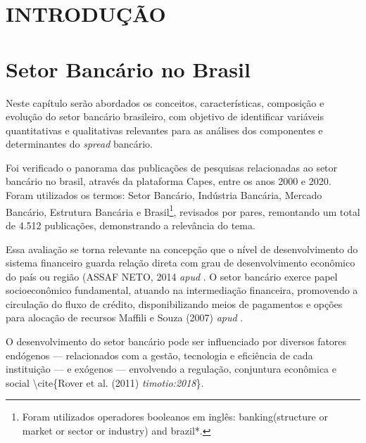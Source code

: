 \documentclass[12pt,openright,oneside,a4paper,chapter=TITLE,section=TITLE,subsection=Title,english,french,spanish,portugues,sumario=tradicional]{04-class-files/abntex2}
\begin{document}




\textual
\pagestyle{simple}

\chapter[INTRODUÇÃO]{INTRODUÇÃO}

\textual
\pagestyle{simple}

\chapter{Setor Bancário no Brasil}

Neste capítulo serão abordados os conceitos, características, composição e
evolução do setor bancário brasileiro, com objetivo de identificar variáveis
quantitativas e qualitativas relevantes para as análises dos componentes e
determinantes do \emph{spread} bancário.

Foi verificado o panorama das publicações de pesquisas relacionadas ao setor bancário no brasil, através da plataforma Capes, entre os anos 2000 e 2020. Foram utilizados os termos: Setor Bancário, Indústria Bancária, Mercado Bancário, Estrutura Bancária e Brasil\footnote{Foram utilizados operadores booleanos em inglês: banking(structure or market or sector or industry) and brazil*.}, revisados por pares, remontando um total de 4.512 publicações, demonstrando a relevância do tema.

Essa avaliação se torna relevante na concepção que o nível de desenvolvimento
do sistema financeiro guarda relação direta com grau de desenvolvimento
econômico do país ou região (ASSAF NETO, 2014 \emph{apud} \cite{timotio:2018}. O
setor bancário exerce papel socioeconômico fundamental, atuando na intermediação financeira, promovendo a circulação do fluxo de crédito, disponibilizando meios de pagamentos e opções para alocação de recursos Maffili e Souza (2007) \emph{apud} \cite{timotio:2018}.

O desenvolvimento do setor bancário pode ser influenciado por diversos fatores endógenos --- relacionados com a gestão, tecnologia e eficiência de cada instituição --- e exógenos --- envolvendo a regulação, conjuntura econômica e social \textbackslash{}cite\{Rover et al. (2011) \emph{timotio:2018}\}.
\end{document}
